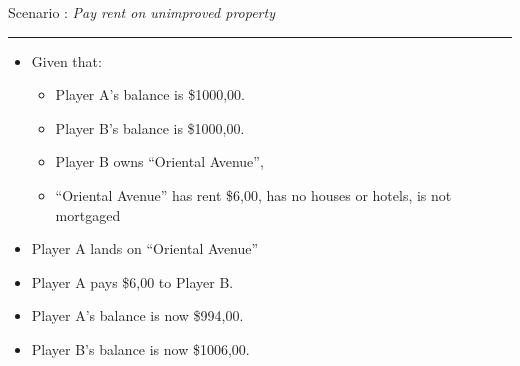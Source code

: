 \documentclass[handout,t,12pt]{beamer}
\newcommand{\Square}[1]{``#1''}
\newcommand{\money}[1]{\$#1,00}
\newcounter{scenarioid}\setcounter{scenarioid}{0}
\newenvironment{scenario}[1]{%
\addtocounter{scenarioid}{1} 
{\Large Scenario \thescenarioid: \emph{#1}\\[3px]\hrule}
\vspace{1\bigskipamount}
}{%
}
\begin{document}
  \begin{frame}
    \begin{scenario}{Pay rent on unimproved property}
      \begin{itemize}
        \item Given that:
        \begin{itemize}
          \item Player A's balance is \money{1000}.
          \item Player B's balance is \money{1000}.
          \item Player B owns \Square{Oriental Avenue},
          \item \Square{Oriental Avenue} has rent \money{6}, has no houses or hotels, is not mortgaged
        \end{itemize}
        \item Player A lands on \Square{Oriental Avenue}
        \item Player A pays \money{6} to Player B.
        \item Player A's balance is now  \money{994}.
        \item Player B's balance is now \money{1006}.
      \end{itemize}
    \end{scenario}
  \end{frame}
  


\end{document}
